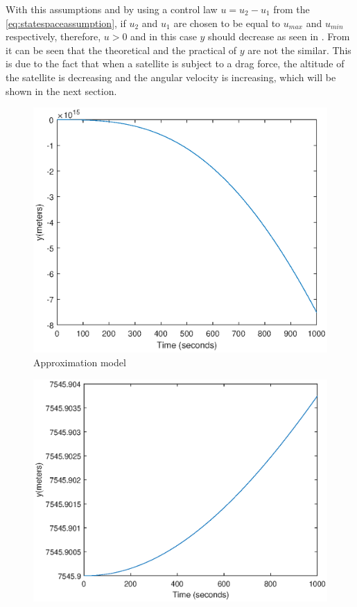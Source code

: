 With this assumptions and by using a control law $u= u_2 - u_1$ from the \eqref{eq:statespaceassumption}, if $u_2$ and $u_1$ are chosen to be equal to  $u_{max}$ and $u_{min}$ respectively, therefore, $u>0$ and in this case $y$ should decrease as seen in . From  it can be seen that the theoretical and the practical of $y$  are not the similar. This is due to the fact that when a satellite is subject to a drag force, the altitude of the satellite is decreasing and the angular velocity is increasing, which will be shown in the next section.
\begin{table}[H]
	\begin{minipage}[b]{0.49\linewidth}
		\centering
		\begin{figure}[H]
			\centering
			\includegraphics[width=1\linewidth]{figures/pic2.eps}
			\caption{Approximation model}
			\label{fig:u1}
		\end{figure}
	\end{minipage}\hfill
	\begin{minipage}[b]{0.49\linewidth}
		\centering
		\begin{figure}[H]
			\centering
			\includegraphics[width=1\linewidth]{figures/pic1.eps}

\end{figure}
\end{minipage}
\end{table}
